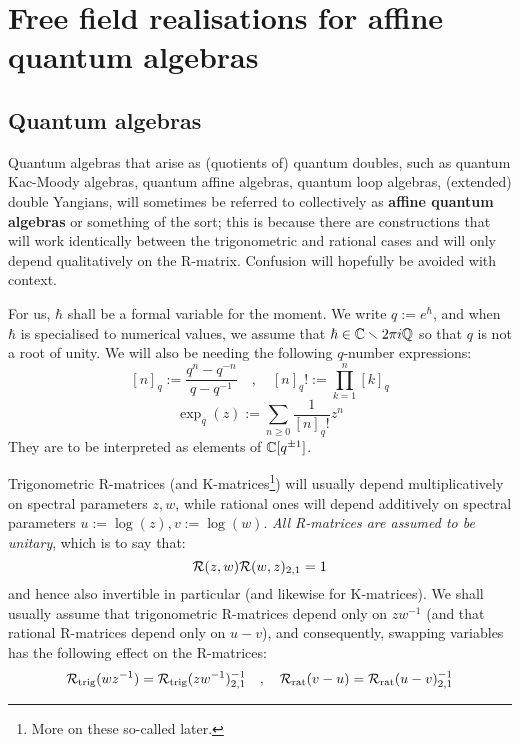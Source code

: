 \section{Free field realisations for affine quantum algebras}
    \subsection{Quantum algebras}
        Quantum algebras that arise as (quotients of) quantum doubles, such as quantum Kac-Moody algebras, quantum affine algebras, quantum loop algebras, (extended) double Yangians, will sometimes be referred to collectively as \textbf{affine quantum algebras} or something of the sort; this is because there are constructions that will work identically between the trigonometric and rational cases and will only depend qualitatively on the R-matrix. Confusion will hopefully be avoided with context.
    
        For us, $\hbar$ shall be a formal variable for the moment. We write $q := e^{\hbar}$, and when $\hbar$ is specialised to numerical values, we assume that $\hbar \in \mathbb{C} \smallsetminus 2\pi i \mathbb{Q}$ so that $q$ is not a root of unity. We will also be needing the following $q$-number expressions:
            $$[n]_q := \frac{q^n - q^{-n}}{q - q^{-1}} \quad, \quad [n]_q! := \prod_{k = 1}^n [k]_q$$
            $$\exp_q(z) := \sum_{n \geq 0} \frac{1}{[n]_q!} z^n$$
        They are to be interpreted as elements of $\mathbb{C}[q^{\pm 1}]$.

        Trigonometric R-matrices (and K-matrices\footnote{More on these so-called  later.}) will usually depend multiplicatively on spectral parameters $z, w$, while rational ones will depend additively on spectral parameters $u := \log(z), v := \log(w)$. \textit{All R-matrices are assumed to be unitary}, which is to say that:
            \begin{equation} \label{equation: R_matrix_unitarity}
                \mathcal{R}(z, w) \mathcal{R}(w, z)_{2, 1} = 1
            \end{equation}
        and hence also invertible in particular (and likewise for K-matrices). We shall usually assume that trigonometric R-matrices depend only on $zw^{-1}$ (and that rational R-matrices depend only on $u - v$), and consequently, swapping variables has the following effect on the R-matrices:
            \begin{equation} \label{equation: swapping_spectral_parameters_in_R_matrices}
                \mathcal{R}_{\mathrm{trig}}(wz^{-1}) = \mathcal{R}_{\mathrm{trig}}(zw^{-1})^{-1}_{2, 1}
                \quad, \quad
                \mathcal{R}_{\mathrm{rat}}(v - u) = \mathcal{R}_{\mathrm{rat}}(u - v)^{-1}_{2, 1}
            \end{equation}
    
